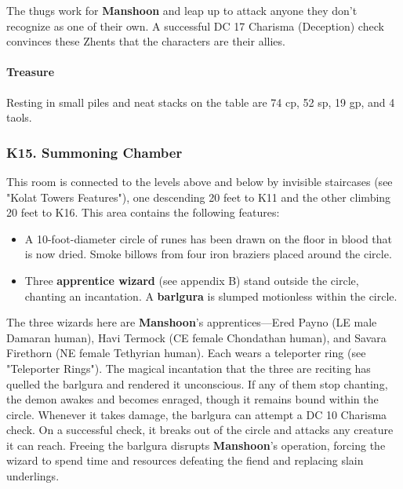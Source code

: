 \documentclass[10pt,a4paper,twoside,twocolumn,openany,nodeprecatedcode]{dndbook}
\begin{document}
The thugs work for \textbf{Manshoon} and leap up to attack anyone they don't recognize as one of their own. A successful DC 17 Charisma (Deception) check convinces these Zhents that the characters are their allies.
\paragraph{Treasure}
Resting in small piles and neat stacks on the table are 74 cp, 52 sp, 19 gp, and 4 taols.
\subsubsection{K15. Summoning Chamber}
This room is connected to the levels above and below by invisible staircases (see "Kolat Towers Features"), one descending 20 feet to K11 and the other climbing 20 feet to K16. This area contains the following features:
\begin{itemize}

\item A 10-foot-diameter circle of runes has been drawn on the floor in blood that is now dried. Smoke billows from four iron braziers placed around the circle.
\item Three \textbf{apprentice wizard} (see appendix B) stand outside the circle, chanting an incantation. A \textbf{barlgura} is slumped motionless within the circle.
\end{itemize}


The three wizards here are \textbf{Manshoon}'s apprentices—Ered Payno (LE male Damaran human), Havi Termock (CE female Chondathan human), and Savara Firethorn (NE female Tethyrian human). Each wears a teleporter ring (see "Teleporter Rings"). The magical incantation that the three are reciting has quelled the barlgura and rendered it unconscious. If any of them stop chanting, the demon awakes and becomes enraged, though it remains bound within the circle. Whenever it takes damage, the barlgura can attempt a DC 10 Charisma check. On a successful check, it breaks out of the circle and attacks any creature it can reach.
Freeing the barlgura disrupts \textbf{Manshoon}'s operation, forcing the wizard to spend time and resources defeating the fiend and replacing slain underlings.
\end{document}

